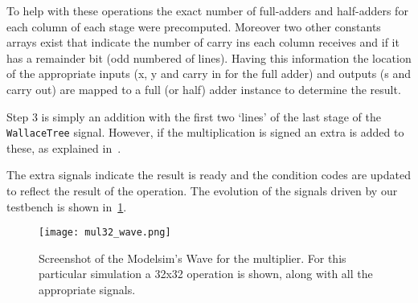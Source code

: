 To help with these operations the exact number of full-adders and half-adders for each column of each stage were precomputed. Moreover two other constants arrays exist that indicate the number of carry ins each column receives and if it has a remainder bit (odd numbered of lines).
Having this information the location of the appropriate inputs (x, y and carry in for the full adder) and outputs (s and carry out) are mapped to a full (or half) adder instance to determine the result.

Step 3 is simply an addition with the first two `lines' of the last stage of the \texttt{WallaceTree} signal. However, if the multiplication is signed an extra \STDV is added to these, as explained in~\cite{part3}.

The extra signals indicate the result is ready and the condition codes are updated to reflect the result of the operation.  
The evolution of the signals driven by our testbench is shown in~\ref{fig:mul32_wave}.


\begin{figure}[H]
\centering
\texttt{[image: mul32\_wave.png]}
\caption{Screenshot of the Modelsim's Wave for the multiplier. For this particular simulation a 32x32 operation is shown, along with all the appropriate signals.}
\label{fig:mul32_wave}
\end{figure}